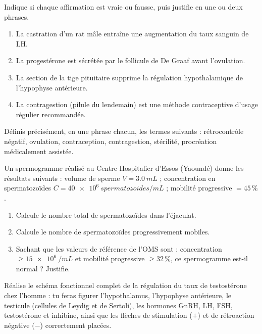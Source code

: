 \documentclass[11pt]{article}
\newcommand{\cle}[1]{{\popxbold\color{popdark}#1}}
\newcounter{popsec}
\newcounter{popsub}
\newcommand{\courssub}[1]{%
  \stepcounter{popsub}%
  \par\vspace{9pt}\noindent{\popxbold\fontsize{11.5}{13}\selectfont\color{popink}{\color{poporange}\thepopsec.\thepopsub}\hspace{6pt}#1}\par\nopagebreak\vspace{4pt}
}
\begin{document}
\begin{exercice}
Indique si chaque affirmation est vraie ou fausse, puis justifie en une ou deux phrases.
\begin{enumerate}
\item La castration d'un rat mâle entraîne une augmentation du taux sanguin de LH.
\item La progestérone est sécrétée par le follicule de De Graaf avant l'ovulation.
\item La section de la tige pituitaire supprime la régulation hypothalamique de l'hypophyse antérieure.
\item La contragestion (pilule du lendemain) est une méthode contraceptive d'usage régulier recommandée.
\end{enumerate}
\end{exercice}

\begin{exercice}[Définitions]
Définis précisément, en une phrase chacun, les termes suivants : \cle{rétrocontrôle négatif}, \cle{ovulation}, \cle{contraception}, \cle{contragestion}, \cle{stérilité}, \cle{procréation médicalement assistée}.
\end{exercice}

\begin{exercice}
Un spermogramme réalisé au Centre Hospitalier d'Essos (Yaoundé) donne les résultats suivants : volume de sperme $V = \SI{3,0}{mL}$ ; concentration en spermatozoïdes $C = \SI{40e6}{spermatozoides/mL}$ ; mobilité progressive $= 45\,\%$.
\begin{enumerate}
\item Calcule le nombre total de spermatozoïdes dans l'éjaculat.
\item Calcule le nombre de spermatozoïdes progressivement mobiles.
\item Sachant que les valeurs de référence de l'OMS sont : concentration $\geq \SI{15e6}{/mL}$ et mobilité progressive $\geq 32\,\%$, ce spermogramme est-il normal ? Justifie.
\end{enumerate}
\end{exercice}

\courssub{Je m'entraîne}

\begin{exercice}
Réalise le schéma fonctionnel complet de la régulation du taux de testostérone chez l'homme : tu feras figurer l'hypothalamus, l'hypophyse antérieure, le testicule (cellules de Leydig et de Sertoli), les hormones GnRH, LH, FSH, testostérone et inhibine, ainsi que les flèches de stimulation ($+$) et de rétroaction négative ($-$) correctement placées.
\end{exercice}
\end{document}
